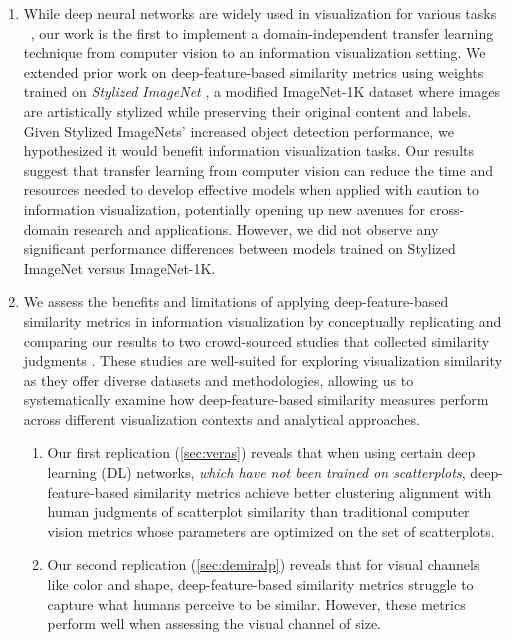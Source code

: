 \documentclass[sigconf]{acmart}
\begin{document}
\begin{enumerate}
    \item While deep neural networks are widely used in visualization for various tasks ~\cite{wu2021ai4vis, wang2021survey}, our work is the first to implement a domain-independent transfer learning technique from computer vision \cite{zhangUnreasonableEffectivenessDeep2018, kumarBetterImageNetClassifiers2022} to an information visualization setting. We extended prior work on deep-feature-based similarity metrics using weights trained on \textit{Stylized ImageNet} \cite{geirhos2018imagenet}, a modified ImageNet-1K dataset where images are artistically stylized while preserving their original content and labels. Given Stylized ImageNets' increased object detection performance, we hypothesized it would benefit information visualization tasks.
    Our results suggest that transfer learning from computer vision can reduce the time and resources needed to develop effective models when applied with caution to information visualization, potentially opening up new avenues for cross-domain research and applications. However, we did not observe any significant performance differences between models trained on Stylized ImageNet versus ImageNet-1K.
    \item We assess the benefits and limitations of applying deep-feature-based similarity metrics in information visualization by conceptually replicating and comparing our results to two crowd-sourced studies that collected similarity judgments \cite{demiralp2014learning, veras2019discriminability}. These studies are well-suited for exploring visualization similarity as they offer diverse datasets and methodologies, allowing us to systematically examine how deep-feature-based similarity measures perform across different visualization contexts and analytical approaches. 
    
    \begin{enumerate}
        \item Our first replication (\cref{sec:veras}) reveals that when using certain deep learning (DL) networks, \textit{which have not been trained on scatterplots}, deep-feature-based similarity metrics achieve better clustering alignment with human judgments of scatterplot similarity than traditional computer vision metrics whose parameters are optimized on the set of scatterplots.
        \item Our second replication (\cref{sec:demiralp}) reveals that for visual channels like color and shape, deep-feature-based similarity metrics struggle to capture what humans perceive to be similar. However, these metrics perform well when assessing the visual channel of size.
    \end{enumerate}
\end{enumerate}
\end{document}
